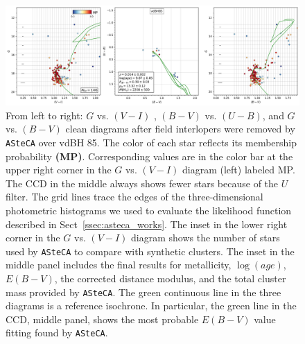 \documentclass[draft]{aa}
\begin{document}
\begin{figure}[ht]
    \centering
    \includegraphics[width=\hsize]{../figs/cmds_vdBH85.png}
\caption{From left to right: $G$ vs. $(V-I)$ , $(B-V)$ vs. $(U-B)$,
and $G$ vs. $(B-V)$ clean diagrams after field interlopers
were removed by \texttt{ASteCA} over vdBH 85. The color of each star reflects
its membership probability \textbf{(MP)}. Corresponding values are in the color bar at
the upper right corner in the $G$ vs. $(V-I)$ diagram (left) labeled
MP. The CCD in the middle always shows fewer stars because of the $U$ filter.
The grid lines trace the edges of the three-dimensional photometric histograms we used
to evaluate the likelihood function described in Sect~\ref{ssec:asteca_works}.
The inset in the lower right corner in the $G$ vs. $(V-I)$ diagram shows
the number of stars used by \texttt{ASteCA} to compare with synthetic clusters.
The inset in the middle panel includes the final
results for metallicity, $\log(age)$, $E(B-V)$, the corrected distance
modulus, and the total cluster mass provided by \texttt{ASteCA}. The green
continuous line in the three diagrams is a reference isochrone. In
particular, the green line in the CCD, middle panel, shows the
most probable $E(B-V)$ value fitting found by \texttt{ASteCA}.
}
    \label{fig:fundpars_vdBH85}
\end{figure}
\end{document}
